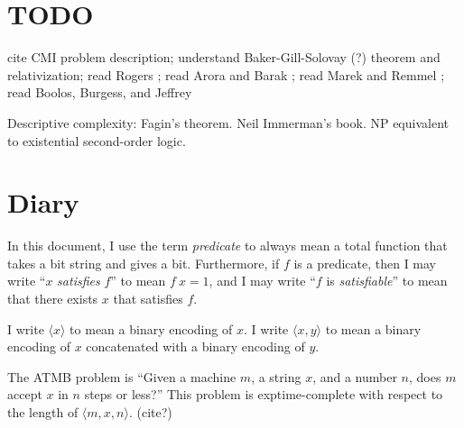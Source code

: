 \newcommand\mP{\ensuremath{\mathcal P}}
\newcommand\mM{\ensuremath{\mathcal M}}
\newcommand\mL{\ensuremath{\mathcal L}}
\newcommand\bB{\ensuremath{\mathbb B}}
\newcommand\amb{\operatorname{amb}}
\newcommand\ambc{\operatorname{ambc}}
\newcommand\fhead{\ensuremath{\operatorname{head}}}
\newcommand\ftail{\ensuremath{\operatorname{tail}}}
\newcommand\fcons{\ensuremath{\operatorname{cons}}}
\newcommand\aTIME{\operatorname{\alpha-TIME}}
\newcommand\idTIME{\operatorname{id-TIME}}
\newcommand\mPTIME{\operatorname{\mP-TIME}}
\newcommand\TIME{\operatorname{\mathsf{TIME}}}
\newcommand\DTIME{\operatorname{\mathsf{DTIME}}}
\newcommand\NTIME{\operatorname{\mathsf{NTIME}}}
\newcommand\EXPTIME{\ensuremath{\mathsf{EXP}}}
\newcommand\PTIME{\ensuremath{\mathsf{P}}}
\newcommand\NPTIME{\ensuremath{\mathsf{NP}}}
\newcommand\NSPACE{\operatorname{NSPACE}}
\newcommand\DSPACE{\operatorname{DSPACE}}
\newcommand\SDP{\ensuremath{\operatorname{SD}}}

\section{TODO}

cite CMI problem description;
understand Baker-Gill-Solovay (?) theorem and relativization;
read Rogers \cite{Rogers1987};
read Arora and Barak \cite{Arora2009};
read Marek and Remmel \cite{Marek2009};
read Boolos, Burgess, and Jeffrey \cite{Boolos2002}

Descriptive complexity: Fagin's theorem.
Neil Immerman's book.
NP equivalent to existential second-order logic.

\section{Diary}

In this document, I use the term \emph{predicate} to always mean
a total function that takes a bit string and gives a bit.
Furthermore, if $f$ is a predicate, then
I may write ``$x$ \emph{satisfies} $f$'' to mean $f~x = 1$, and
I may write ``$f$ is \emph{satisfiable}'' to mean
that there exists $x$ that satisfies $f$.

\newcommand\encoding[1]{\langle#1\rangle}

I write $\encoding{x}$ to mean a binary encoding of $x$.
I write $\encoding{x,y}$ to mean a binary encoding of $x$
concatenated with a binary encoding of $y$.

The ATMB problem is ``Given a machine $m$, a string $x$,
and a number $n$,
does $m$ accept $x$ in $n$ steps or less?''
This problem is exptime-complete with respect to the length of
$\encoding{m,x,n}$. (cite?)

